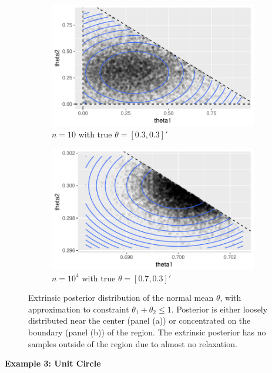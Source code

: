 \documentclass[10pt]{article}
\DeclareMathOperator{\1}{\mathbbm{1}}
\begin{document}
\begin{figure}[H]
   \begin{subfigure}[b]{0.45\textwidth}
    \includegraphics[width=1\textwidth]{linear_inequal_1}
    \caption{$n=10$ with true $\theta=[0.3,0.3]'$}
	\end{subfigure}
    \begin{subfigure}[b]{0.45\textwidth}
     \includegraphics[width=1\textwidth]{linear_inequal_2}
     \caption{$n=10^4$ with true $\theta=[0.7,0.3]'$}
     	\end{subfigure}
\caption{Extrinsic posterior distribution of the normal mean $\theta$, with approximation to constraint $\theta_1+\theta_2\le 1$. Posterior is either loosely distributed near the center (panel (a)) or concentrated on the boundary (panel (b)) of the region. The extrinsic posterior has no samples outside of the region due to almost no relaxation.}
\label{linear_inequality}
\end{figure}

{\bf Example 3: Unit Circle}
\end{document}
